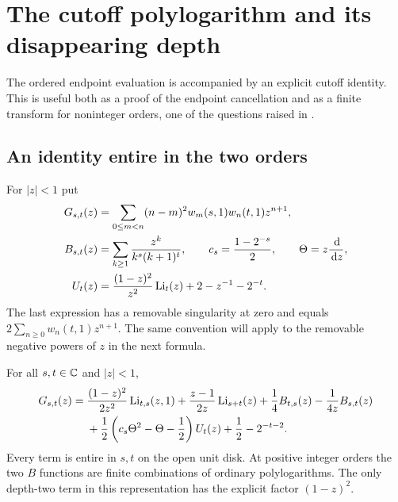 \section{The cutoff polylogarithm and its disappearing depth}
\label{sec:polylog}

The ordered endpoint evaluation is accompanied by an explicit cutoff
identity. This is useful both as a proof of the endpoint cancellation
and as a finite transform for noninteger orders, one of the questions
raised in \cite{repo:finite}.

\subsection{An identity entire in the two orders}

For $|z|<1$ put
\begin{align}
 G_{s,t}(z)&=\sum_{0\le m<n}(n-m)^2
             w_m(s,1)w_n(t,1)z^{n+1},\label{eq:cutoff-g}\\
 B_{s,t}(z)&=\sum_{k\ge1}\frac{z^k}{k^s(k+1)^t},
 \qquad c_s=\frac{1-2^{-s}}2,\qquad \Theta=z\frac{\,\mathrm d}{\,\mathrm d z},
 \label{eq:cutoff-b}\\
 U_t(z)&=\frac{(1-z)^2}{z^2}\operatorname{Li}_t(z)+2-z^{-1}-2^{-t}.
 \label{eq:cutoff-u}
\end{align}
The last expression has a removable singularity at zero and equals
$2\sum_{n\ge0}w_n(t,1)z^{n+1}$. The same convention will apply to
the removable negative powers of $z$ in the next formula.

\begin{theorem}\label{thm:cutoff}
For all $s,t\in\mathbb C$ and $|z|<1$,
\begin{align}
 G_{s,t}(z)={}&\frac{(1-z)^2}{2z^2}\operatorname{Li}_{t,s}(z,1)
 +\frac{z-1}{2z}\operatorname{Li}_{s+t}(z)
 +\frac14B_{t,s}(z)-\frac1{4z}B_{s,t}(z)\notag\\
 &+\frac12\left(c_s\Theta^2-\Theta-\frac12\right)U_t(z)
 +\frac12-2^{-t-2}.
 \label{eq:cutoff-master}
\end{align}
Every term is entire in $s,t$ on the open unit disk. At positive
integer orders the two $B$ functions are finite combinations of
ordinary polylogarithms. The only depth-two term in this representation
has the explicit factor $(1-z)^2$.
\end{theorem}

